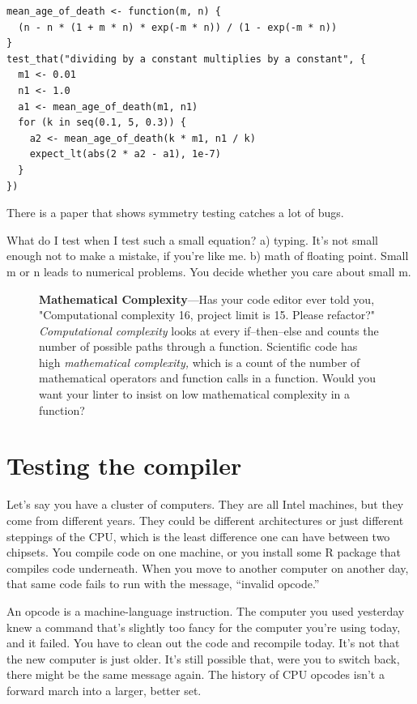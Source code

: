 \documentclass[fleqn,10pt]{olplainarticle}
\newenvironment{callout}
{
\begin{figure}
\begin{center}
\begin{minipage}{0.9\textwidth}
\begin{framed}
}
{
\end{framed}
\end{minipage}
\end{center}
\end{figure}
}
\begin{document}
\begin{lstlisting}
mean_age_of_death <- function(m, n) {
  (n - n * (1 + m * n) * exp(-m * n)) / (1 - exp(-m * n))
}
test_that("dividing by a constant multiplies by a constant", {
  m1 <- 0.01
  n1 <- 1.0
  a1 <- mean_age_of_death(m1, n1)
  for (k in seq(0.1, 5, 0.3)) {
    a2 <- mean_age_of_death(k * m1, n1 / k)
    expect_lt(abs(2 * a2 - a1), 1e-7)
  }
})
\end{lstlisting}

There is a paper that shows symmetry testing catches a lot of bugs.

What do I test when I test such a small equation?
a) typing. It's not small enough not to make a mistake, if you're like me.
b) math of floating point. Small m or n leads to numerical problems.
You decide whether you care about small m.


\begin{callout}
\textbf{Mathematical Complexity}---Has your code editor ever told you,
"Computational complexity 16, project limit is 15. Please refactor?"
\emph{Computational complexity} looks at every if--then--else and counts the
number of possible paths through a function.
Scientific code has high \emph{mathematical complexity,\/} which is a
count of the number of mathematical operators and function calls in
a function. Would you want your linter to insist on low mathematical complexity in
a function?
\end{callout}


\section{Testing the compiler}

Let's say you have a cluster of computers. They are all Intel machines,
but they come from different years. They could be different architectures
or just different steppings of the CPU, which is the least difference
one can have between two chipsets. You compile code on one machine,
or you install some R package that compiles code underneath. When
you move to another computer on another day, that same code fails
to run with the message, ``invalid opcode.''

An opcode is a machine-language instruction. The computer you used
yesterday knew a command that's slightly too fancy for the computer
you're using today, and it failed. You have to clean out the code
and recompile today. It's not that the new computer is just older.
It's still possible that, were you to switch back, there might be
the same message again. The history of CPU opcodes isn't a forward
march into a larger, better set.
\end{document}

